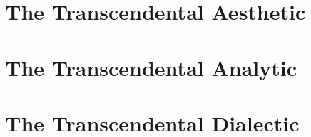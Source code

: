 \section*{The Transcendental Aesthetic}

\section*{The Transcendental Analytic}

\section*{The Transcendental Dialectic}
